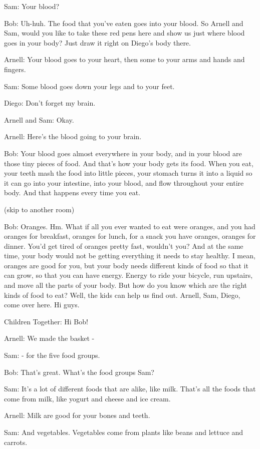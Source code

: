 Sam: Your blood?

Bob: Uh-huh. The food that you've eaten goes into your blood. So Arnell and Sam, would you like to take these red pens here and show us just where blood goes in your body? Just draw it right on Diego's body there.

Arnell: Your blood goes to your heart, then some to your arms and hands and fingers.

Sam: Some blood goes down your legs and to your feet.

Diego: Don't forget my brain.

Arnell and Sam: Okay.

Arnell: Here's the blood going to your brain.

Bob: Your blood goes almost everywhere in your body, and in your blood are those tiny pieces of food. And that's how your body gets its food. When you eat, your teeth mash the food into little pieces, your stomach turns it into a liquid so it can go into your intestine, into your blood, and flow throughout your entire body. And that happens every time you eat.

(skip to another room)

Bob: Oranges. Hm. What if all you ever wanted to eat were oranges, and you had oranges for breakfast, oranges for lunch, for a snack you have oranges, oranges for dinner. You'd get tired of oranges pretty fast, wouldn't you? And at the same time, your body would not be getting everything it needs to stay healthy. I mean, oranges are good for you, but your body needs different kinds of food so that it can grow, so that you can have energy. Energy to ride your bicycle, run upstairs, and move all the parts of your body. But how do you know which are the right kinds of food to eat? Well, the kids can help us find out. Arnell, Sam, Diego, come over here. Hi guys.

Children Together: Hi Bob!

Arnell: We made the basket -

Sam: - for the five food groups.

Bob: That's great. What's the food groups Sam?

Sam: It's a lot of different foods that are alike, like milk. That's all the foods that come from milk, like yogurt and cheese and ice cream.

Arnell: Milk are good for your bones and teeth.

Sam: And vegetables. Vegetables come from plants like beans and lettuce and carrots.

